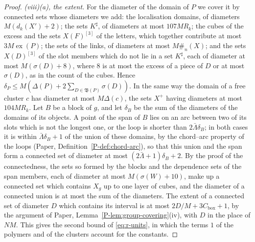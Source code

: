\documentclass[11pt]{preprint}
\numberwithin{equation}{section}
\theoremstyle{definition}
\theoremstyle{remark}
\theoremstyle{plain}
\begin{document}
\begin{proof}
\emph{(viii)(a), the extent.} For the diameter of the domain of $P$ we cover it by connected sets whose diameters we add: the localisation domains, of diameters $M(d_k(X') + 2)$; the sets $K^\sharp$, of diameters at most $107MR_k$; the cubes of the excess and the sets $X(F)^{[3]}$ of the letters, which together contribute at most $3M\operatorname{ex}(P)$; the sets of the links, of diameters at most $M\#_n(X)$; and the sets $X(D)^{[3]}$ of the slot members which do not lie in a set $K^\sharp$, each of diameter at most $M(\sigma(D) + 8)$, where $8$ is at most the excess of a piece of $D$ or at most $\sigma(D)$, as in the count of the cubes. Hence $\delta_P \leq M(\Delta(P) + 2\sum_{D \in \mathfrak B(P)}\sigma(D))$. In the same way the domain of a free cluster $c$ has diameter at most $M\Delta(c)$, the sets $X^+$ having diameters at most $104MR_k$. Let $B$ be a block of $g$, and let $\delta_B$ be the sum of the diameters of the domains of its objects. A point of the span of $B$ lies on an arc between two of its slots which is not the longest one, or the loop is shorter than $2\bar\Lambda\delta_B$; in both cases it is within $\bar\Lambda\delta_B + 1$ of the union of these domains, by the chord--arc property of the loops (Paper, Definition~\ref{P-def:chord-arc}), so that this union and the span form a connected set of diameter at most $(2\bar\Lambda + 1)\delta_B + 2$. By the proof of the connectedness, the sets so formed by the blocks and the dependence sets of the span members, each of diameter at most $M(\sigma(W) + 10)$, make up a connected set which contains $X_g$ up to one layer of cubes, and the diameter of a connected union is at most the sum of the diameters. The extent of a connected set of diameter $D$ which contains its interval is at most $2D/M + 3C_{\mathrm{box}} + 1$, by the argument of Paper, Lemma~\ref{P-lem:group-covering}(iv), with $D$ in the place of $NM$. This gives the second bound of \eqref{eq:r-units}, in which the terms $1$ of the polymers and of the clusters account for the constants.


\end{proof}
\end{document}

